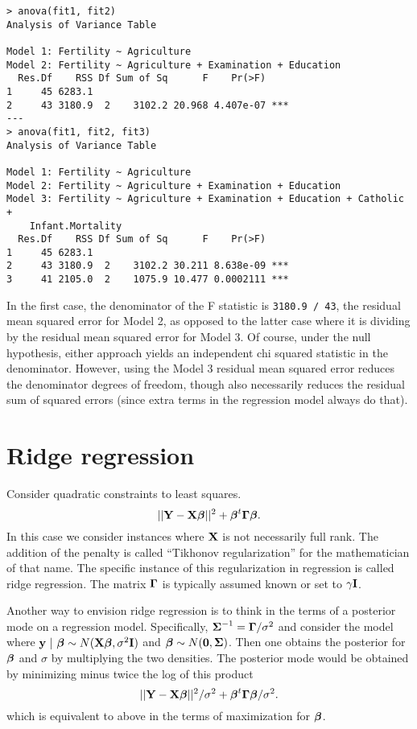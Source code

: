\begin{verbatim}
> anova(fit1, fit2)
Analysis of Variance Table

Model 1: Fertility ~ Agriculture
Model 2: Fertility ~ Agriculture + Examination + Education
  Res.Df    RSS Df Sum of Sq      F    Pr(>F)    
1     45 6283.1                                  
2     43 3180.9  2    3102.2 20.968 4.407e-07 ***
---
> anova(fit1, fit2, fit3)
Analysis of Variance Table

Model 1: Fertility ~ Agriculture
Model 2: Fertility ~ Agriculture + Examination + Education
Model 3: Fertility ~ Agriculture + Examination + Education + Catholic + 
    Infant.Mortality
  Res.Df    RSS Df Sum of Sq      F    Pr(>F)    
1     45 6283.1                                  
2     43 3180.9  2    3102.2 30.211 8.638e-09 ***
3     41 2105.0  2    1075.9 10.477 0.0002111 ***
\end{verbatim}
In the first case, the denominator of the F statistic is 
\texttt{3180.9 / 43}, the residual mean squared error for Model 2,
as opposed to the latter case where it is dividing by the residual
mean squared error for Model 3. Of course, under the null hypothesis,
either approach yields an independent chi squared statistic in the denominator.
However, using the Model 3 residual mean squared error reduces the
denominator degrees of freedom, though also necessarily reduces the
residual sum of squared errors (since extra terms in the regression
model always do that). 

\section{Ridge regression}

Consider quadratic constraints to least squares.
$$
||\mathbf{Y} - \mathbf{X} \boldsymbol{\beta}||^2 + \boldsymbol{\beta}^t \boldsymbol{\Gamma} \boldsymbol{\beta}.
$$
In this case we consider instances where $\mathbf{X}$ is not necessarily full rank. The
addition of the penalty is called ``Tikhonov regularization'' for the mathematician of
that name. The specific instance of this regularization in regression is called ridge
regression. The matrix $\boldsymbol{\Gamma}$ is typically assumed known or set to $\gamma \mathbf{I}$. 

Another way to envision ridge regression is to think in the terms of a posterior mode 
on a regression model. Specifically, $\boldsymbol{\Sigma}^{-1} = \boldsymbol{\Gamma} / \sigma^2$ and consider the model
where $\mathbf{y} ~|~ \boldsymbol{\beta} \sim N(\mathbf{X} \boldsymbol{\beta}, \sigma^2 \mathbf{I})$ and $\boldsymbol{\beta} \sim N(\mathbf{0}, \boldsymbol{\Sigma})$. 
Then one obtains the posterior for $\boldsymbol{\beta}$ and $\sigma$ by multiplying the two densities. The
posterior mode would be obtained by minimizing minus twice the log of this product
$$
||\mathbf{Y} - \mathbf{X} \boldsymbol{\beta}||^2 / \sigma^2 + \boldsymbol{\beta}^t \boldsymbol{\Gamma} \boldsymbol{\beta} / \sigma^2.
$$
which is equivalent to above in the terms of maximization for $\boldsymbol{\beta}$.

